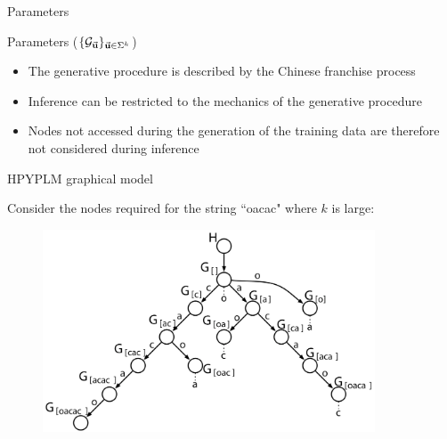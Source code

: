 \documentclass{beamer}
\newcommand{\G}{\mathcal{G}}
\newcommand{\bu}{{\bf u}}
\begin{document}
\begin{frame}[t]{Parameters}
	\begin{block}{Parameters ($ \{ \G_{\vec \bu} \}_{\vec \bu \in \Sigma^k}$)}
		\begin{itemize}
			\item The generative procedure is described by the Chinese franchise process
			\item Inference can be restricted to the mechanics of the generative procedure
			\item Nodes not accessed during the generation of the training data are therefore not considered during inference
		\end{itemize}
	\end{block}	
\end{frame}

%

\begin{frame}[t]{HPYPLM graphical model}
	
	Consider the nodes required for the string ``oacac" where $k$ is large: 
	\begin{figure}[t]
		\begin{center}
			\includegraphics[height = 6cm]{../figs/prefix_trie_not_coloured.pdf}
		\end{center}
	\end{figure}
\end{frame}
\end{document}
